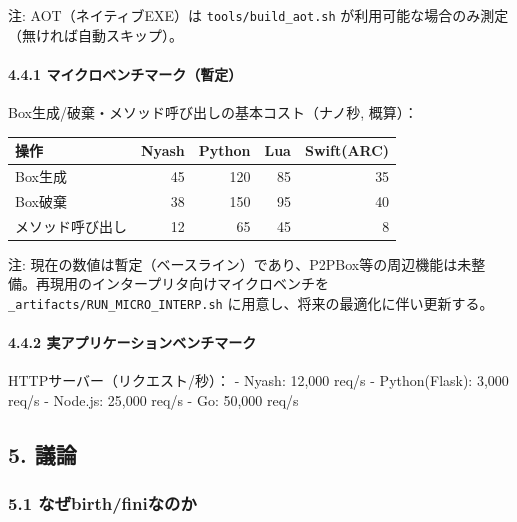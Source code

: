 \documentclass[
]{article}
\begin{document}
注: AOT（ネイティブEXE）は \texttt{tools/build\_aot.sh}
が利用可能な場合のみ測定（無ければ自動スキップ）。

\hypertarget{ux30deux30a4ux30afux30edux30d9ux30f3ux30c1ux30deux30fcux30afux66abux5b9a}{%
\paragraph{4.4.1
マイクロベンチマーク（暫定）}\label{ux30deux30a4ux30afux30edux30d9ux30f3ux30c1ux30deux30fcux30afux66abux5b9a}}

Box生成/破棄・メソッド呼び出しの基本コスト（ナノ秒, 概算）：

\begin{longtable}[]{@{}lrrrr@{}}
\toprule\noalign{}
操作 & Nyash & Python & Lua & Swift(ARC) \\
\midrule\noalign{}
\endhead
\bottomrule\noalign{}
\endlastfoot
Box生成 & 45 & 120 & 85 & 35 \\
Box破棄 & 38 & 150 & 95 & 40 \\
メソッド呼び出し & 12 & 65 & 45 & 8 \\
\end{longtable}

注:
現在の数値は暫定（ベースライン）であり、P2PBox等の周辺機能は未整備。再現用のインタープリタ向けマイクロベンチを
\texttt{\_artifacts/RUN\_MICRO\_INTERP.sh}
に用意し、将来の最適化に伴い更新する。

\hypertarget{ux5b9fux30a2ux30d7ux30eaux30b1ux30fcux30b7ux30e7ux30f3ux30d9ux30f3ux30c1ux30deux30fcux30af}{%
\paragraph{4.4.2
実アプリケーションベンチマーク}\label{ux5b9fux30a2ux30d7ux30eaux30b1ux30fcux30b7ux30e7ux30f3ux30d9ux30f3ux30c1ux30deux30fcux30af}}

HTTPサーバー（リクエスト/秒）： - Nyash: 12,000 req/s - Python(Flask):
3,000 req/s - Node.js: 25,000 req/s - Go: 50,000 req/s

\hypertarget{ux8b70ux8ad6}{%
\subsection{5. 議論}\label{ux8b70ux8ad6}}

\hypertarget{ux306aux305cbirthfiniux306aux306eux304b}{%
\subsubsection{5.1
なぜbirth/finiなのか}\label{ux306aux305cbirthfiniux306aux306eux304b}}
\end{document}

